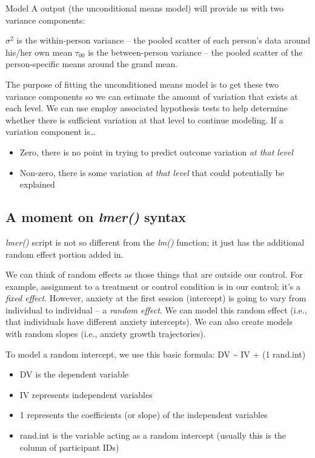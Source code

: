 \documentclass[
  english,
]{book}
\providecommand{\tightlist}{%
  \setlength{\itemsep}{0pt}\setlength{\parskip}{0pt}}
\begin{document}
Model A output (the unconditional means model) will provide us with two variance components:

\(\sigma^2\) is the within-person variance -- the pooled scatter of each person's data around his/her own mean
\(\tau_{00}\) is the between-person variance -- the pooled scatter of the person-specific means around the grand mean.

The purpose of fitting the unconditioned means model is to get these two variance components so we can estimate the amount of variation that exists at each level. We can use employ associated hypothesis tests to help determine whether there is sufficient variation at that level to continue modeling. If a variation component is\ldots{}

\begin{itemize}
\tightlist
\item
  Zero, there is no point in trying to predict outcome variation \emph{at that level}
\item
  Non-zero, there is some variation \emph{at that level} that could potentially be explained
\end{itemize}

\hypertarget{a-moment-on-lmer-syntax}{%
\subsection{\texorpdfstring{A moment on \emph{lmer()} syntax}{A moment on lmer() syntax}}\label{a-moment-on-lmer-syntax}}

\emph{lmer()} script is not so different from the \emph{lm()} function; it just has the additional random effect portion added in.

We can think of random effects as those things that are outside our control. For example, assignment to a treatment or control condition is in our control; it's a \emph{fixed effect}. However, anxiety at the first session (intercept) is going to vary from individual to individual -- a \emph{random effect}. We can model this random effect (i.e., that individuals have different anxiety intercepts). We can also create models with random slopes (i.e., anxiety growth trajectories).

To model a random intercept, we use this basic formula: DV \textasciitilde{} IV + (1 \textbar{} rand.int)

\begin{itemize}
\tightlist
\item
  DV is the dependent variable
\item
  IV represents independent variables
\item
  1 represents the coefficients (or slope) of the independent variables
\item
  rand.int is the variable acting as a random intercept (usually this is the column of participant IDs)
\end{itemize}
\end{document}
